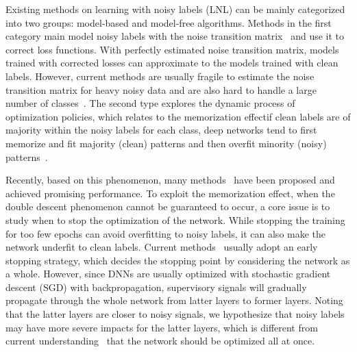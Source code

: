 \documentclass[11pt]{article}
\begin{document}
Existing methods on learning with noisy labels (LNL) can be mainly categorized into two groups: model-based and model-free algorithms. Methods in the first category main model noisy labels with the noise transition matrix~\cite{Patrini2017forward, Xu2019DMI, Xie2020UDA, xia2020parts} and use it to correct loss functions. With perfectly estimated noise transition matrix, models trained with corrected losses can approximate to the models trained with clean labels. However, current methods are usually fragile to estimate the noise transition matrix for heavy noisy data and are also hard to handle a large number of classes~\cite{han2018co}. The second type explores the dynamic process of optimization policies, which relates to the memorization effectif clean labels are of majority within the noisy labels for each class, deep networks tend to first memorize and fit majority (clean) patterns and then overfit minority (noisy) patterns~\cite{Arpit2017Look}. 

Recently, based on this phenomenon, many methods~\cite{han2018co, tanaka2018joint, Wang2018Iterative, Li2020DivideMix, Liu2020ELR} have been proposed and achieved promising performance. To exploit the memorization effect, when the double descent phenomenon \cite{belkin2019reconciling,nakkiran2020deep,ishida2020we} cannot be guaranteed to occur, a core issue is to study when to stop the optimization of the network. While stopping the training for too few epochs can avoid overfitting to noisy labels, it can also make the network underfit to clean labels. Current methods~\cite{tanaka2018joint, Nguyen2020SELF} usually adopt an early stopping strategy, which decides the stopping point by considering the network as a whole. However, since DNNs are usually optimized with stochastic gradient descent (SGD) with backpropagation, supervisory signals will gradually propagate through the whole network from latter layers to former layers.  
Noting that the latter layers are closer to  noisy signals, we hypothesize that  noisy labels may have more severe impacts for the latter layers, which is different from current understanding~\cite{Li2020DivideMix, Liu2020ELR} that the network should be optimized all at once. 
\end{document}
